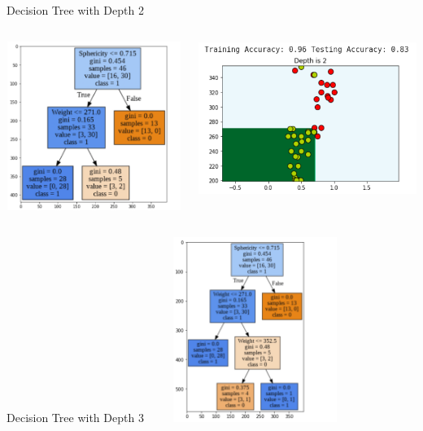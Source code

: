 \documentclass[aspectratio=169,14pt]{beamer}
\begin{document}
\begin{frame}{Decision Tree with Depth 2}
\begin{columns}
	\begin{flushright}
		\vspace{-1cm}
		\includegraphics[width=6cm,  height=5.5cm]{Images/dtree2.png}
	\end{flushright}
\includegraphics[width=7.5cm, height=5cm]{Images/depth2.png}\\

\end{columns}
\end{frame}

\begin{frame}{Decision Tree with Depth 3}
\centering
\includegraphics[width=7cm, height=6cm]{Images/dtree3.png}
\end{frame}
\end{document}
